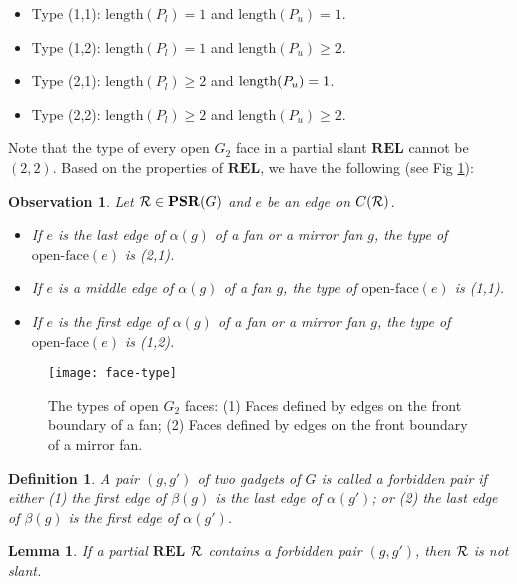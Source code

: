 \documentclass[11pt]{article}
\newcommand{\R}{{\cal R}}
\newcommand{\REL}{\mathbf{REL}}
\newcommand{\PSR}{\mathbf{PSR}}
\newtheorem{definition}[figure]{Definition}
\newtheorem{lemma}[figure]{Lemma}
\newtheorem{observation}[figure]{Observation}
\begin{document}
\begin{itemize}
\item Type (1,1): $\mbox{length}(P_l)= 1$ and $\mbox{length}(P_u)= 1$.
\item Type (1,2): $\mbox{length}(P_l)= 1$ and $\mbox{length}(P_u)\geq 2$.
\item Type (2,1): $\mbox{length}(P_l)\geq 2$ and $\hbox{length}(P_u)= 1$.
\item Type (2,2): $\mbox{length}(P_l)\geq 2$ and $\mbox{length}(P_u)\geq 2$.
\end{itemize}

Note that the type of every open $G_2$ face in a partial slant
$\REL$ cannot be $(2,2)$. Based on the properties of $\REL$, we
have the following (see Fig \ref{fig:face-type}):

\begin{observation}
Let $\R \in \PSR(G)$ and $e$ be an edge on $C(\R)$.
\begin{itemize}
\item If $e$ is the last edge of $\alpha(g)$ of a fan or a mirror fan $g$,
the type of $\mbox{open-face}(e)$ is (2,1).
\item If $e$ is a middle edge of $\alpha(g)$ of a fan $g$,
the type of $\mbox{open-face}(e)$ is (1,1).
\item If $e$ is the first edge of $\alpha(g)$ of a fan or a mirror fan $g$,
the type of $\mbox{open-face}(e)$ is (1,2).
\end{itemize}
\end{observation}

\begin{figure}[ht]
\begin{center}
\texttt{[image: face-type]}
  \centering
\caption{The types of open $G_2$ faces:
(1) Faces defined by edges on the front boundary of a fan;
(2) Faces defined by edges on the front boundary of a mirror fan.}
\label{fig:face-type}
\end{center}
\end{figure}
\vspace{-0.25in}

\begin{definition}\label{def:forbidden}
A pair $(g,g')$ of two gadgets of $G$ is called a {\em forbidden pair} if either
(1) the first edge of $\beta(g)$ is the last edge of $\alpha(g')$; or
(2) the last edge of $\beta(g)$ is the first edge of $\alpha(g')$.
\end{definition}

\begin{lemma}\label{lemma:forbidden}
If a partial $\REL$ $\R$ contains a forbidden pair $(g,g')$,
then $\R$ is not slant.
\end{lemma}
\end{document}
